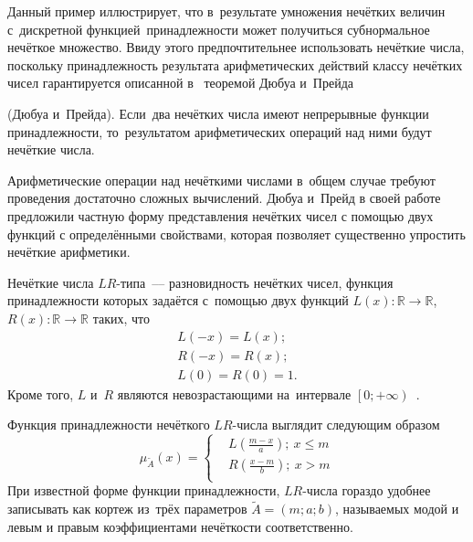 Данный пример иллюстрирует, что в~результате умножения нечётких величин с~дискретной функцией~принадлежности может получиться субнормальное нечёткое множество. Ввиду этого предпочтительнее использовать нечёткие числа, поскольку принадлежность результата арифметических действий классу нечётких чисел гарантируется описанной в~\cite{Rutkovskaya} теоремой Дюбуа и~Прейда
\begin{theorem}
\label{th:dubois-prade}
(Дюбуа и~Прейда). Если~два нечётких числа имеют непрерывные функции принадлежности, то~результатом арифметических операций над ними будут нечёткие числа.
\end{theorem}

Арифметические операции над нечёткими числами в~общем случае требуют проведения достаточно сложных вычислений. Дюбуа и~Прейд в своей работе~\cite{Dubois_Prade} предложили частную форму представления нечётких чисел с помощью двух функций с определёнными свойствами, которая позволяет существенно упростить нечёткие арифметики. 
\begin{mydef}
Нечёткие числа $LR$-типа~--– разновидность нечётких чисел, функция принадлежности которых задаётся с~помощью двух функций $L(x):\mathbb{R} \to \mathbb{R}$, $R(x):\mathbb{R} \to \mathbb{R}$ таких, что 
\begin{gather*}
	L\left( -x \right)=L\left( x \right); \\
	R\left( -x \right)=R\left( x \right); \\
	L\left( 0 \right)=R\left(  0 \right)=1.
\end{gather*}
Кроме того, $L$ и~$R$ являются невозрастающими на~интервале $\left[ 0;+\infty  \right)$~\cite{Rutkovskaya}.
\end{mydef}
Функция принадлежности нечёткого $LR$-числа выглядит следующим образом
\begin{equation}
\label{eq:membership-lr-general}
	 \mu_{\tilde A}\left( x \right)=\left\{ 
		 \begin{aligned}
			 & L\left( \frac{m-x}{a} \right);\ x \leqslant m \\ 
			 & R\left( \frac{x-m}{b} \right);\ x>m \\ 
		 \end{aligned} 
	 \right.
\end{equation}
При известной форме функции принадлежности, $LR$-числа гораздо удобнее записывать как кортеж из~трёх параметров $\tilde A = \left(m; a; b \right)$, называемых модой и левым и правым коэффициентами нечёткости соответственно.

